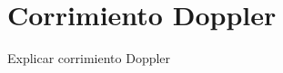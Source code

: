 \documentclass[../../main.tex]{subfiles}
\begin{document}
\graphicspath{{./figures}}
\chapter{Corrimiento Doppler}\label{ap::doppler}

Explicar corrimiento Doppler
\end{document}
